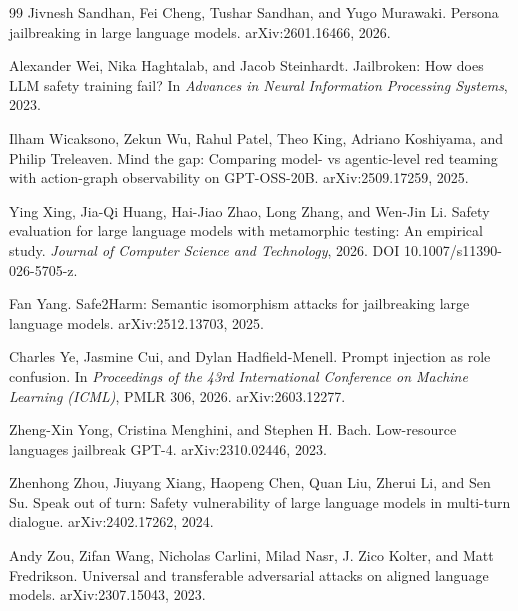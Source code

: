 \documentclass{article}
\begin{document}
\begin{thebibliography}{99}
Jivnesh Sandhan, Fei Cheng, Tushar Sandhan, and Yugo Murawaki.
\newblock Persona jailbreaking in large language models.
\newblock arXiv:2601.16466, 2026.

Alexander Wei, Nika Haghtalab, and Jacob Steinhardt.
\newblock Jailbroken: How does LLM safety training fail?
\newblock In \emph{Advances in Neural Information Processing Systems}, 2023.

Ilham Wicaksono, Zekun Wu, Rahul Patel, Theo King, Adriano Koshiyama, and Philip
Treleaven.
\newblock Mind the gap: Comparing model- vs agentic-level red teaming with action-graph
observability on GPT-OSS-20B.
\newblock arXiv:2509.17259, 2025.

Ying Xing, Jia-Qi Huang, Hai-Jiao Zhao, Long Zhang, and Wen-Jin Li.
\newblock Safety evaluation for large language models with metamorphic testing: An empirical
study.
\newblock \emph{Journal of Computer Science and Technology}, 2026.
\newblock DOI 10.1007/s11390-026-5705-z.

Fan Yang.
\newblock Safe2Harm: Semantic isomorphism attacks for jailbreaking large language models.
\newblock arXiv:2512.13703, 2025.

Charles Ye, Jasmine Cui, and Dylan Hadfield-Menell.
\newblock Prompt injection as role confusion.
\newblock In \emph{Proceedings of the 43rd International Conference on Machine
Learning (ICML)}, PMLR 306, 2026.
\newblock arXiv:2603.12277.

Zheng-Xin Yong, Cristina Menghini, and Stephen H. Bach.
\newblock Low-resource languages jailbreak GPT-4.
\newblock arXiv:2310.02446, 2023.

Zhenhong Zhou, Jiuyang Xiang, Haopeng Chen, Quan Liu, Zherui Li, and Sen Su.
\newblock Speak out of turn: Safety vulnerability of large language models in multi-turn
dialogue.
\newblock arXiv:2402.17262, 2024.

Andy Zou, Zifan Wang, Nicholas Carlini, Milad Nasr, J. Zico Kolter, and Matt
Fredrikson.
\newblock Universal and transferable adversarial attacks on aligned language models.
\newblock arXiv:2307.15043, 2023.

\end{thebibliography}
\end{document}
